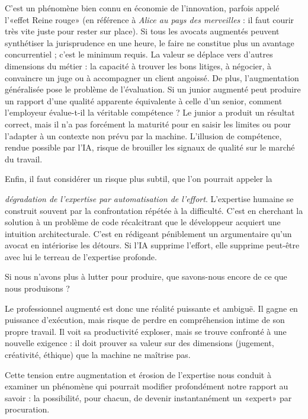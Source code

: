 C'est un phénomène bien connu en économie de l'innovation, parfois appelé l'«effet Reine rouge» (en référence à \emph{Alice au pays des merveilles} : il faut courir très vite juste pour rester sur place). Si tous les avocats augmentés peuvent synthétiser la jurisprudence en une heure, le faire ne constitue plus un avantage concurrentiel ; c'est le minimum requis. La valeur se déplace vers d'autres dimensions du métier : la capacité à trouver les bons litiges, à négocier, à convaincre un juge ou à accompagner un client angoissé. De plus, l'augmentation généralisée pose le problème de l'évaluation. Si un junior augmenté peut produire un rapport d'une qualité apparente équivalente à celle d'un senior, comment l'employeur évalue-t-il la véritable compétence ? Le junior a produit un résultat correct, mais il n'a pas forcément la maturité pour en saisir les limites ou pour l'adapter à un contexte non prévu par la machine. L'illusion de compétence, rendue possible par l'IA, risque de brouiller les signaux de qualité sur le marché du travail.

Enfin, il faut considérer un risque plus subtil, que l'on pourrait appeler la

\emph{dégradation de l'expertise par automatisation de l'effort}. L'expertise humaine se construit souvent par la confrontation répétée à la difficulté. C'est en cherchant la solution à un problème de code récalcitrant que le développeur acquiert une intuition architecturale. C'est en rédigeant péniblement un argumentaire qu'un avocat en intériorise les détours. Si l'IA supprime l'effort, elle supprime peut-être avec lui le terreau de l'expertise profonde.

\begin{aiquote}
Si nous n'avons plus à lutter pour produire, que savons-nous encore de ce que nous produisons ?
\end{aiquote}

Le professionnel augmenté est donc une réalité puissante et ambiguë. Il gagne en puissance d'exécution, mais risque de perdre en compréhension intime de son propre travail. Il voit sa productivité exploser, mais se trouve confronté à une nouvelle exigence : il doit prouver sa valeur sur des dimensions (jugement, créativité, éthique) que la machine ne maîtrise pas.

Cette tension entre augmentation et érosion de l'expertise nous conduit à examiner un phénomène qui pourrait modifier profondément notre rapport au savoir : la possibilité, pour chacun, de devenir instantanément un «expert» par procuration.

